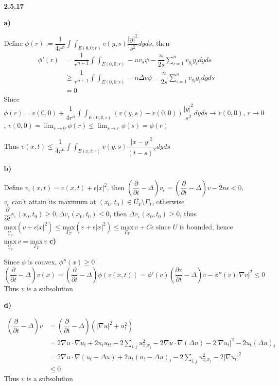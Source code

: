 \documentclass[12pt]{article}
\begin{document}
\textbf{2.5.17} \par
\textbf{a)} \par
Define $\displaystyle \phi(r):=\dfrac{1}{4r^{n}}\int\int_{E(0,0;r)}v(y,s)\dfrac{|y|^{2}}{s^{2}}dyds$, then
\[
\begin{aligned}
\phi'(r)
&=\dfrac{1}{r^{n+1}}\int\int_{E(0,0;r)}-nv_{s}\psi-\dfrac{n}{2s}\sum_{i=1}^{n}v_{y_{i}}y_{i}dyds \\
&\geq\dfrac{1}{r^{n+1}}\int\int_{E(0,0;r)}-n\Delta v\psi-\dfrac{n}{2s}\sum_{i=1}^{n}v_{y_{i}}y_{i}dyds \\
&=0
\end{aligned}
\]
Since $\displaystyle\phi(r)=v(0,0)+\dfrac{1}{4r^{n}}\int\int_{E(0,0;r)}\left(v(y,s)-v(0,0)\right)\dfrac{|y|^{2}}{s^{2}}dyds\rightarrow v(0,0), \,r\rightarrow 0$, $\displaystyle v(0,0)=\lim_{s\rightarrow 0}\phi(r)\leq\lim_{s\rightarrow r}\phi(s)=\phi(r)$ \par
Thus $\displaystyle v(x,t)\leq\dfrac{1}{4r^{n}}\int\int_{E(x,t;r)}v(y,s)\dfrac{|x-y|^{2}}{(t-s)^{2}}dyds$ \par
\textbf{b)} \par
Define $v_{\epsilon}(x,t)=v(x,t)+\epsilon|x|^{2}$, then $\left(\dfrac{\partial}{\partial t}-\Delta\right)v_{\epsilon}=\left(\dfrac{\partial}{\partial t}-\Delta\right)v-2n\epsilon<0$, $v_{\epsilon}$ can't attain its maximum at $(x_{0},t_{0})\in \overline{U_{T}}\setminus\Gamma_{T}$, otherwise $\dfrac{\partial}{\partial t}v_{\epsilon}(x_{0},t_{0})\geq 0, \Delta v_{\epsilon}(x_{0},t_{0})\leq 0$, then $\Delta v_{\epsilon}(x_{0},t_{0})\geq 0$, thus $\underset{\overline{U_{T}}}{\mathrm{max}}\left(v+\epsilon|x|^{2}\right)\leq\underset{\Gamma_{T}}{\mathrm{max}}\left(v+\epsilon|x|^{2}\right)\leq \underset{\Gamma_{T}}{\mathrm{max}} \,v+C\epsilon$ since $U$ is bounded, hence $\underset{\overline{U_{T}}}{\mathrm{max}}\,v=\underset{\Gamma_{T}}{\mathrm{max}} \,v$
\textbf{c)} \par
Since $\phi$ is convex, $\phi''(x)\geq 0$
\[
\left(\dfrac{\partial}{\partial t}-\Delta\right) v(x)=\left(\dfrac{\partial}{\partial t}-\Delta\right)\phi\left(v(x,t)\right)=\phi'(v)\left(\dfrac{\partial v}{\partial t}-\Delta\right)v-\phi''(v)|\nabla v|^{2}\leq 0
\]
Thus $v$ is a subsolution \par
\textbf{d)} \par
\[
\begin{aligned}
\left(\dfrac{\partial}{\partial t}-\Delta\right)v 
&= \left(\dfrac{\partial}{\partial t}-\Delta\right) \left(\left|\nabla u\right|^{2}+u_{t}^{2}\right)  \\
&= 2\nabla u \cdot \nabla u_{t}+2u_{t}u_{tt}-2\sum_{i,j}u_{x_{i}x_{j}}^{2}-2 \nabla u \cdot \nabla(\Delta u)-2|\nabla u_{t}|^{2}-2u_{t}(\Delta u)_{t} \\
&=2\nabla u \cdot \nabla (u_{t}-\Delta u)+2u_{t}(u_{t}-\Delta u)_{t}-2\sum_{i,j}u_{x_{i}x_{j}}^{2}-2|\nabla u_{t}|^{2} \\
&\leq 0
\end{aligned}
\]
Thus $v$ is a subsolution \par
\end{document}
